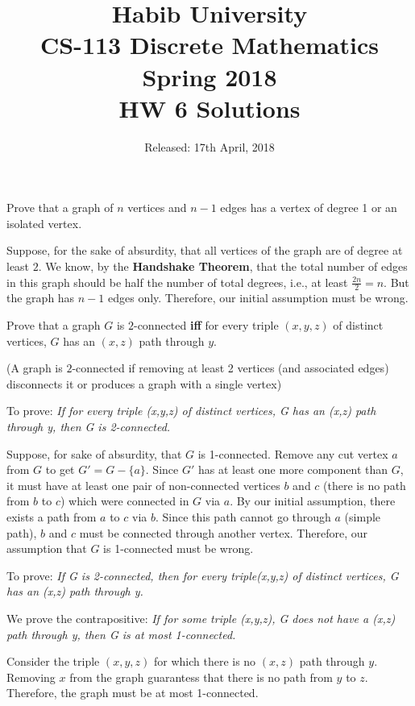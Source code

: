 \documentclass[addpoints]{exam}
\title{Habib University\\CS-113 Discrete Mathematics\\Spring 2018\\HW 6 Solutions}
\date{Released: 17th April, 2018}
\begin{document}
\maketitle

\begin{questions}



\question
Prove that a graph of $n$ vertices and $n-1$ edges has a vertex of degree 1 or an isolated vertex.
  \begin{solution}
  Suppose, for the sake of absurdity, that all vertices of the graph are of degree at least $2$. We know, by the \textbf{Handshake Theorem}, that the total number of edges in this graph should be half the number of total degrees, i.e., at least $\frac{2n}{2}=n$. But the graph has $n-1$ edges only. Therefore, our initial assumption must be wrong. 
  \end{solution}

\question 
Prove that a graph $G$ is $2$-connected \textbf{iff} for every triple $(x,y,z)$ of distinct vertices, $G$ has an $(x,z)$ path through $y$.

(A graph is $2$-connected if removing at least 2 vertices (and associated edges) disconnects it or produces a graph with a single vertex)  


  \begin{solution}
  
  To prove: \textit{If for every triple (x,y,z) of distinct vertices, G has an (x,z) path through y, then G is 2-connected.}
  
  Suppose, for sake of absurdity, that $G$ is 1-connected. Remove any cut vertex $a$ from $G$ to get $G' = G - \{a\}$. Since $G'$ has at least one more component than $G$, it must have at least one pair of non-connected vertices $b$ and $c$ (there is no path from $b$ to $c$) which were connected in $G$ via $a$. By our initial assumption, there exists a path from $a$ to $c$ via $b$. Since this path cannot go through $a$ (simple path), $b$ and $c$ must be connected through another vertex. Therefore, our assumption that $G$ is 1-connected must be wrong.
  
  
  To prove: \textit{If G is 2-connected, then for every triple(x,y,z) of distinct vertices, G has an (x,z) path through y.}
  
  We prove the contrapositive: \textit{If for some triple (x,y,z), G does not have a (x,z) path through y, then G is at most 1-connected.}
  
  Consider the triple $(x,y,z)$ for which there is no $(x,z)$ path through $y$. Removing $x$ from the graph guarantess that there is no path from $y$ to $z$. Therefore, the graph must be at most 1-connected.
  

\end{solution}
\end{questions}
\end{document}
